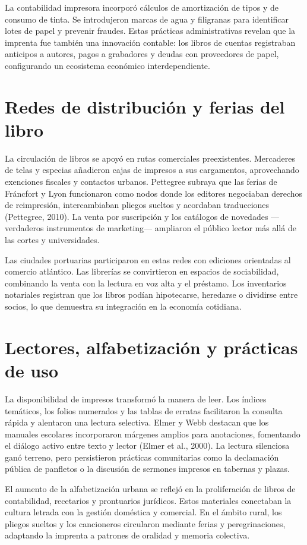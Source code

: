 La contabilidad impresora incorporó cálculos de amortización de tipos y de consumo de tinta. Se introdujeron marcas de agua y filigranas para identificar lotes de papel y prevenir fraudes. Estas prácticas administrativas revelan que la imprenta fue también una innovación contable: los libros de cuentas registraban anticipos a autores, pagos a grabadores y deudas con proveedores de papel, configurando un ecosistema económico interdependiente.

\section{Redes de distribución y ferias del libro}
La circulación de libros se apoyó en rutas comerciales preexistentes. Mercaderes de telas y especias añadieron cajas de impresos a sus cargamentos, aprovechando exenciones fiscales y contactos urbanos. Pettegree subraya que las ferias de Fráncfort y Lyon funcionaron como nodos donde los editores negociaban derechos de reimpresión, intercambiaban pliegos sueltos y acordaban traducciones (Pettegree, 2010). La venta por suscripción y los catálogos de novedades —verdaderos instrumentos de marketing— ampliaron el público lector más allá de las cortes y universidades.

Las ciudades portuarias participaron en estas redes con ediciones orientadas al comercio atlántico. Las librerías se convirtieron en espacios de sociabilidad, combinando la venta con la lectura en voz alta y el préstamo. Los inventarios notariales registran que los libros podían hipotecarse, heredarse o dividirse entre socios, lo que demuestra su integración en la economía cotidiana.

\section{Lectores, alfabetización y prácticas de uso}
La disponibilidad de impresos transformó la manera de leer. Los índices temáticos, los folios numerados y las tablas de erratas facilitaron la consulta rápida y alentaron una lectura selectiva. Elmer y Webb destacan que los manuales escolares incorporaron márgenes amplios para anotaciones, fomentando el diálogo activo entre texto y lector (Elmer et al., 2000). La lectura silenciosa ganó terreno, pero persistieron prácticas comunitarias como la declamación pública de panfletos o la discusión de sermones impresos en tabernas y plazas.

El aumento de la alfabetización urbana se reflejó en la proliferación de libros de contabilidad, recetarios y prontuarios jurídicos. Estos materiales conectaban la cultura letrada con la gestión doméstica y comercial. En el ámbito rural, los pliegos sueltos y los cancioneros circularon mediante ferias y peregrinaciones, adaptando la imprenta a patrones de oralidad y memoria colectiva.

